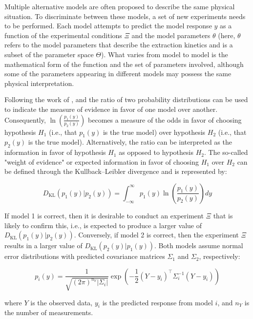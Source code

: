 \documentclass[../Article_Design_of_Experiment.tex]{subfiles}
\begin{document}
	
	Multiple alternative models are often proposed to describe the same physical situation. To discriminate between these models, a set of new experiments needs to be performed. Each model attempts to predict the model response $y$ as a function of the experimental conditions $\Xi$ and the model parameters $\theta$ (here, $\theta$ refers to the model parameters that describe the extraction kinetics and is a subset of the parameter space $\Theta$). What varies from model to model is the mathematical form of the function and the set of parameters involved, although some of the parameters appearing in different models may possess the same physical interpretation.
	
	Following the work of \citet{Box1967}, \citet{Himmelblau1970} and \citet{Bard1974} the ratio of two probability distributions can be used to indicate the measure of evidence in favor of one model over another. Consequently, $\ln\left( \frac{p_1(y)}{p_2(y)} \right)$ becomes a measure of the odds in favor of choosing hypothesis $H_1$ (i.e., that $p_1(y)$ is the true model) over hypothesis $H_2$ (i.e., that $p_2(y)$ is the true model). Alternatively, the ratio can be interpreted as the information in favor of hypothesis $H_1$ as opposed to hypothesis $H_2$. The so-called "weight of evidence" or expected information in favor of choosing $H_1$ over $H_2$ can be defined through the Kullback–Leibler divergence and is represented by:
	
	{\footnotesize \begin{equation} D_{\mathrm{KL}}\left( p_1(y) | p_2(y) \right) = \int_{-\infty}^{\infty} p_1(y) \ln\left( \frac{p_1(y)}{p_2(y)} \right) dy \end{equation} }
	
	If model 1 is correct, then it is desirable to conduct an experiment $\Xi$ that is likely to confirm this, i.e., is expected to produce a larger value of $D_{\mathrm{KL}}\left( p_1(y) | p_2(y) \right)$. Conversely, if model 2 is correct, then the experiment $\Xi$ results in a larger value of $D_{\mathrm{KL}}\left( p_2(y) | p_1(y) \right)$. Both models assume normal error distributions with predicted covariance matrices $\Sigma_1$ and $\Sigma_2$, respectively:
	
	{\footnotesize \begin{equation} p_i(y) = \frac{1}{\sqrt{(2\pi)^{n_Y} |\Sigma_i|}} \exp\left( -\frac{1}{2} (Y - y_i)^\top \Sigma_i^{-1} (Y - y_i) \right) \end{equation} }
	
	where $Y$ is the observed data, $y_i$ is the predicted response from model $i$, and $n_Y$ is the number of measurements.
	
\end{document}
